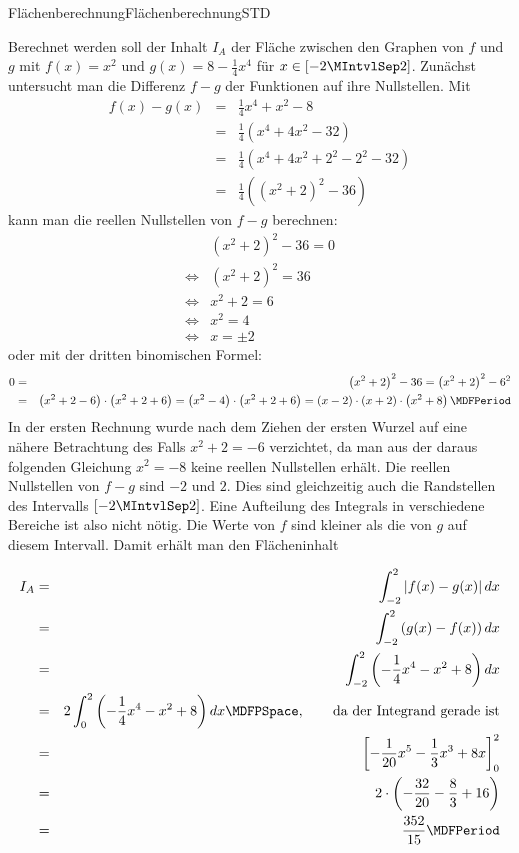 \begin{MXContent}{Flächenberechnung}{Flächenberechnung}{STD}
\begin{MExample}
Berechnet werden soll der Inhalt $I_A$ der Fläche zwischen den Graphen von 
$f$ und $g$ mit $f(x) = x^2$ und $g(x) = 8 - \frac{1}{4} x^4$ für 
$x \in [-2\MIntvlSep  2]$.
Zunächst untersucht man die Differenz $f - g$ der Funktionen auf
ihre Nullstellen. Mit
%
\begin{eqnarray*}
f(x) - g(x) & = & \frac{1}{4} x^4 + x^2 - 8 \\
 & = & \frac{1}{4} \left( x^4 + 4 x^2 - 32 \right) \\
 & = & \frac{1}{4} \left( x^4 + 4 x^2 + 2^2 - 2^2 - 32 \right) \\
 & = & \frac{1}{4} \left( \left( x^2 + 2 \right)^2 - 36 \right) %
\end{eqnarray*}
%
kann man die reellen Nullstellen von $f - g$ berechnen:
\begin{eqnarray*}
& \left( x^2 + 2 \right)^2 - 36 = 0 \\
\Leftrightarrow & \left( x^2 + 2 \right)^2 = 36 \\
\Leftrightarrow & x^2 + 2 = 6 \\
\Leftrightarrow & x^2 = 4 \\
\Leftrightarrow & x = \pm 2  %
\end{eqnarray*}
oder mit der dritten binomischen Formel:
\begin{eqnarray*}
 0 & = & \left( x^2 + 2 \right)^2 - 36 %
 = \left( x^2 + 2 \right)^2 - 6^2 \\
& = & \left(x^2 + 2 - 6 \right) \cdot \left(x^2 + 2 + 6 \right) %
 = \left(x^2 - 4 \right) \cdot \left(x^2 + 2 + 6 \right) %
 = (x - 2) \cdot (x + 2) \cdot \left(x^2 + 8 \right) \MDFPeriod %
\end{eqnarray*}
%
In der ersten Rechnung wurde nach dem Ziehen der ersten Wurzel auf eine nähere 
Betrachtung des Falls $x^2 + 2 = -6$ verzichtet, da man
aus der daraus folgenden Gleichung $x^2 = -8$ keine reellen Nullstellen erhält.
Die reellen Nullstellen von $f-g$ sind $-2$ und $2$.
Dies sind gleichzeitig auch die Randstellen des Intervalls $[-2\MIntvlSep  2]$.
Eine Aufteilung des Integrals in verschiedene Bereiche ist also nicht nötig. 
Die Werte von $f$ sind kleiner als die von $g$ auf diesem Intervall. Damit
erhält man den Flächeninhalt 

\begin{eqnarray*}
I_A &=& \int_{-2}^{2} \left|f(x) - g(x)\right| \MD x \\
 & = & \int_{-2}^{2} \left({g(x) - f(x)}\right) \MD x \\
 & = & \int_{-2}^{2} \left({-\frac{1}{4} x^4 - x^2 + 8 }\right) \MD x \\
 & = & 2 \int_{0}^{2} \left({-\frac{1}{4} x^4 - x^2 + 8 }\right) \MD x %
  \MDFPSpace, \qquad \text{da der Integrand gerade ist} \\
 & = & \left[{-\frac{1}{20} x^5 - \frac{1}{3} x^3 + 8 x}\right]_{0}^{2} \\
 & = & 2\cdot \left({-\frac{32}{20}-\frac{8}{3}+16}\right) \\
 & = & \frac{352}{15} \MDFPeriod %
\end{eqnarray*}
\end{MExample}


\end{MXContent}
